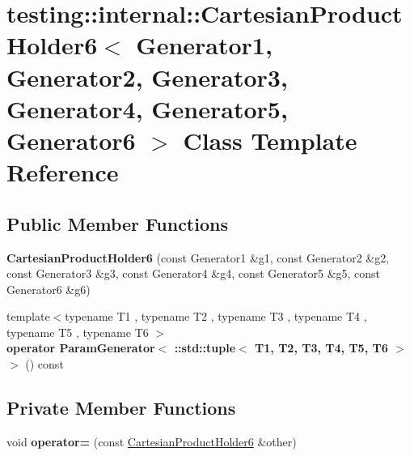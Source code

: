 \hypertarget{classtesting_1_1internal_1_1_cartesian_product_holder6}{}\section{testing\+:\+:internal\+:\+:Cartesian\+Product\+Holder6$<$ Generator1, Generator2, Generator3, Generator4, Generator5, Generator6 $>$ Class Template Reference}
\label{classtesting_1_1internal_1_1_cartesian_product_holder6}
\subsection*{Public Member Functions}
\begin{DoxyCompactItemize}
\item 
\mbox{\label{classtesting_1_1internal_1_1_cartesian_product_holder6_a7bb6f9224a1a6766e3634eb392e1b5f6}} 
{\bfseries Cartesian\+Product\+Holder6} (const Generator1 \&g1, const Generator2 \&g2, const Generator3 \&g3, const Generator4 \&g4, const Generator5 \&g5, const Generator6 \&g6)
\item 
\mbox{\label{classtesting_1_1internal_1_1_cartesian_product_holder6_aa913929b072ce064ba7d00f030e6e3ed}} 
{\footnotesize template$<$typename T1 , typename T2 , typename T3 , typename T4 , typename T5 , typename T6 $>$ }\\{\bfseries operator Param\+Generator$<$ \+::std\+::tuple$<$ T1, T2, T3, T4, T5, T6 $>$ $>$} () const
\end{DoxyCompactItemize}
\subsection*{Private Member Functions}
\begin{DoxyCompactItemize}
\item 
\mbox{\label{classtesting_1_1internal_1_1_cartesian_product_holder6_a279f22f21fb24fd716b958ad20116979}} 
void {\bfseries operator=} (const \mbox{\hyperlink{classtesting_1_1internal_1_1_cartesian_product_holder6}{Cartesian\+Product\+Holder6}} \&other)
\end{DoxyCompactItemize}

